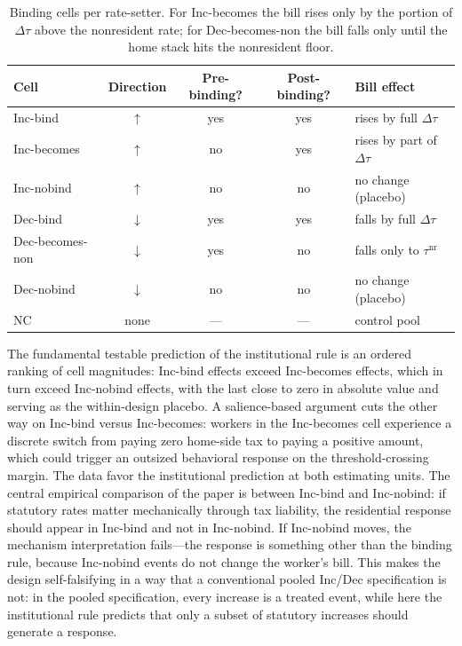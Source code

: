 \documentclass[12pt]{article}
\begin{document}
\begin{table}[H]
\centering
\small
\begin{tabular}{lcccl}
\toprule
Cell & Direction & Pre-binding? & Post-binding? & Bill effect \\
\midrule
Inc-bind         & $\uparrow$  & yes & yes & rises by full $\Delta\tau$ \\
Inc-becomes      & $\uparrow$  & no  & yes & rises by part of $\Delta\tau$ \\
Inc-nobind       & $\uparrow$  & no  & no  & no change (placebo) \\
Dec-bind         & $\downarrow$ & yes & yes & falls by full $\Delta\tau$ \\
Dec-becomes-non  & $\downarrow$ & yes & no  & falls only to $\tau^{\text{nr}}$ \\
Dec-nobind       & $\downarrow$ & no  & no  & no change (placebo) \\
NC               & none & --- & --- & control pool \\
\bottomrule
\end{tabular}
\caption{Binding cells per rate-setter. For Inc-becomes the bill rises only by the portion of $\Delta\tau$ above the nonresident rate; for Dec-becomes-non the bill falls only until the home stack hits the nonresident floor.}
\label{tab:cells}
\end{table}

The fundamental testable prediction of the institutional rule is an
ordered ranking of cell magnitudes: Inc-bind effects exceed
Inc-becomes effects, which in turn exceed Inc-nobind effects, with
the last close to zero in absolute value and serving as the
within-design placebo. A salience-based argument cuts the other way
on Inc-bind versus Inc-becomes: workers in the Inc-becomes cell
experience a discrete switch from paying zero home-side tax to
paying a positive amount, which could trigger an outsized
behavioral response on the threshold-crossing margin. The data
favor the institutional prediction at both estimating units. The
central empirical comparison of the paper is between Inc-bind and
Inc-nobind: if statutory rates matter mechanically through tax
liability, the residential response should appear in Inc-bind and
not in Inc-nobind. If Inc-nobind moves, the mechanism
interpretation fails---the response is something other than the
binding rule, because Inc-nobind events do not change the worker's
bill. This makes the design self-falsifying in a way that a
conventional pooled Inc/Dec specification is not: in the pooled
specification, every increase is a treated event, while here the
institutional rule predicts that only a subset of statutory
increases should generate a response.
\end{document}
